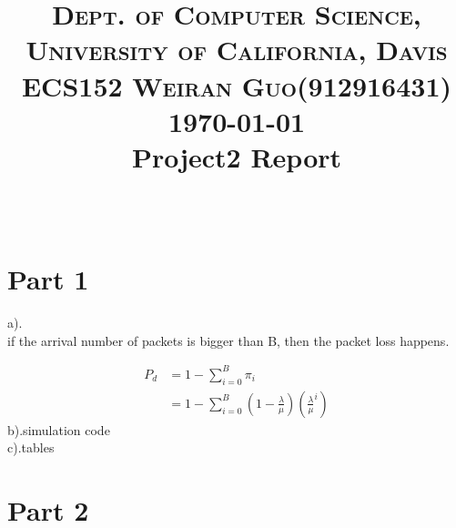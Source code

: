 \documentclass[paper=a4, fontsize=11pt]{scrartcl}
\title{	
\normalfont \normalsize 
\textsc{Dept. of Computer Science, University of California, Davis\\ECS152 \hspace{.5in}
Weiran Guo(912916431) \hspace{.5in} \today}
\horrule{0.5pt} \\[0.4cm]
\huge Project2 Report \\
\horrule{2pt} \\[0.5cm]
}
\date{}
\DeclarePairedDelimiter\floor{\lfloor}{\rfloor}
\numberwithin{equation}{section} %
\numberwithin{figure}{section} %
\numberwithin{table}{section} %
\begin{document}
\maketitle

\vspace{-1in}


\section{Part 1}

       a).\\
       if the arrival number of packets is bigger than B, %
       then the packet loss happens.
       
        \begin{align}
           P_d &= 1 - \sum_{i = 0}^{B} \pi_i\\
            &= 1 - \sum_{i = 0}^{B} (1-\frac{\lambda}{\mu})(\frac{\lambda}{\mu}^i)
       \end{align}
       b).simulation code\\
       
       c).tables\\

    
\section{Part 2}
    
    
\end{document}
